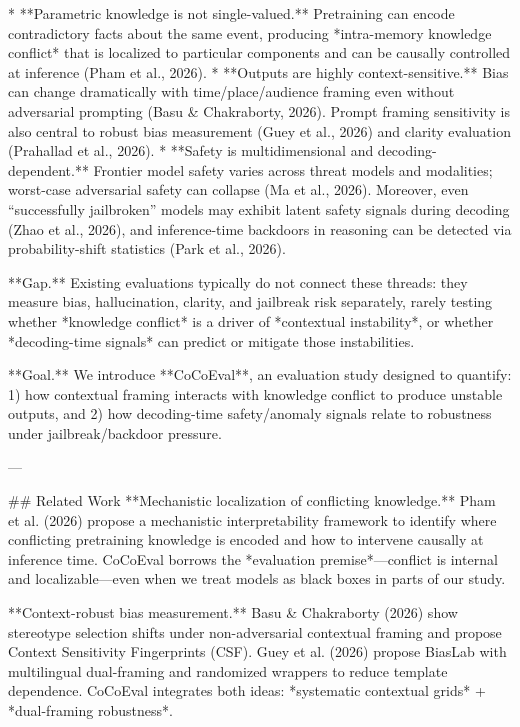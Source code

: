 * **Parametric knowledge is not single-valued.** Pretraining can encode contradictory facts about the same event, producing *intra-memory knowledge conflict* that is localized to particular components and can be causally controlled at inference (Pham et al., 2026).  
* **Outputs are highly context-sensitive.** Bias can change dramatically with time/place/audience framing even without adversarial prompting (Basu & Chakraborty, 2026). Prompt framing sensitivity is also central to robust bias measurement (Guey et al., 2026) and clarity evaluation (Prahallad et al., 2026).  
* **Safety is multidimensional and decoding-dependent.** Frontier model safety varies across threat models and modalities; worst-case adversarial safety can collapse (Ma et al., 2026). Moreover, even “successfully jailbroken” models may exhibit latent safety signals during decoding (Zhao et al., 2026), and inference-time backdoors in reasoning can be detected via probability-shift statistics (Park et al., 2026).

**Gap.** Existing evaluations typically do not connect these threads: they measure bias, hallucination, clarity, and jailbreak risk separately, rarely testing whether *knowledge conflict* is a driver of *contextual instability*, or whether *decoding-time signals* can predict or mitigate those instabilities.

**Goal.** We introduce **CoCoEval**, an evaluation study designed to quantify:  
1) how contextual framing interacts with knowledge conflict to produce unstable outputs, and  
2) how decoding-time safety/anomaly signals relate to robustness under jailbreak/backdoor pressure.

---

## Related Work  
**Mechanistic localization of conflicting knowledge.** Pham et al. (2026) propose a mechanistic interpretability framework to identify where conflicting pretraining knowledge is encoded and how to intervene causally at inference time. CoCoEval borrows the *evaluation premise*—conflict is internal and localizable—even when we treat models as black boxes in parts of our study.

**Context-robust bias measurement.** Basu & Chakraborty (2026) show stereotype selection shifts under non-adversarial contextual framing and propose Context Sensitivity Fingerprints (CSF). Guey et al. (2026) propose BiasLab with multilingual dual-framing and randomized wrappers to reduce template dependence. CoCoEval integrates both ideas: *systematic contextual grids* + *dual-framing robustness*.

